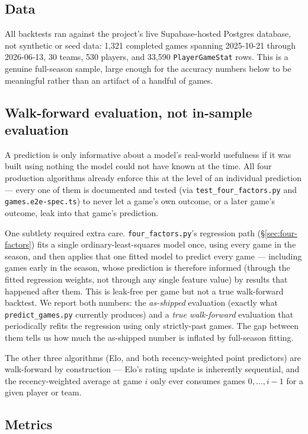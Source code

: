 \documentclass[11pt]{article}
\newcommand{\code}[1]{\allowbreak\texttt{\small #1}\allowbreak}
\begin{document}
\subsection{Data}

All backtests ran against the project's live Supabase-hosted Postgres database, not synthetic or seed data:
1,321 completed games spanning 2025-10-21 through 2026-06-13, 30 teams, 530 players, and 33,590
\code{PlayerGameStat} rows. This is a genuine full-season sample, large enough for the accuracy numbers below
to be meaningful rather than an artifact of a handful of games.

\subsection{Walk-forward evaluation, not in-sample evaluation}

A prediction is only informative about a model's real-world usefulness if it was built using nothing the
model could not have known at the time. All four production algorithms already enforce this at the level of
an individual prediction — every one of them is documented and tested (via \code{test\_four\_factors.py} and
\code{games.e2e-spec.ts}) to never let a game's own outcome, or a later game's outcome, leak into that game's
prediction.

One subtlety required extra care. \code{four\_factors.py}'s regression path
(\S\ref{sec:four-factors}) fits a single ordinary-least-squares model once, using every game in the season,
and then applies that one fitted model to predict every game — including games early in the season, whose
prediction is therefore informed (through the fitted regression weights, not through any single feature
value) by results that happened after them. This is leak-free per game but not a true walk-forward
backtest. We report both numbers: the \emph{as-shipped} evaluation (exactly what \code{predict\_games.py}
currently produces) and a \emph{true walk-forward} evaluation that periodically refits the regression using
only strictly-past games. The gap between them tells us how much the as-shipped number is inflated by
full-season fitting.

The other three algorithms (Elo, and both recency-weighted point predictors) are walk-forward by
construction — Elo's rating update is inherently sequential, and the recency-weighted average at
game $i$ only ever consumes games $0, \ldots, i-1$ for a given player or team.

\subsection{Metrics}
\end{document}
